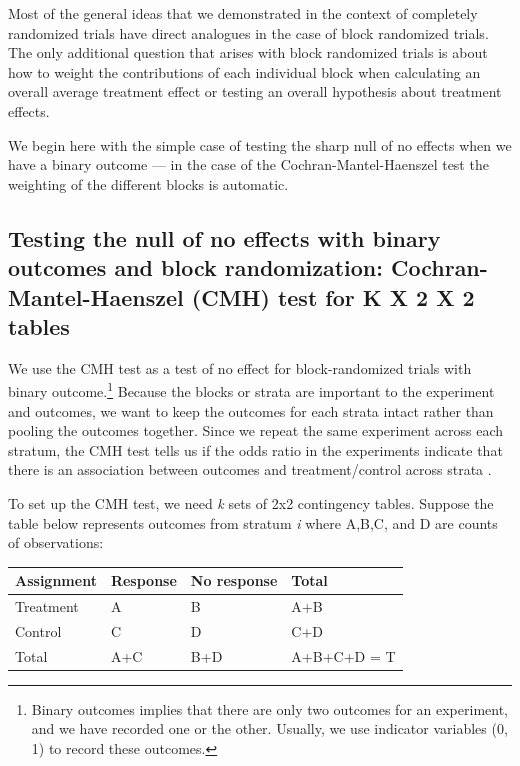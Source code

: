 \documentclass[
  12pt,
]{book}
\theoremstyle{definition}
\theoremstyle{definition}
\theoremstyle{definition}
\theoremstyle{remark}
\begin{document}
Most of the general ideas that we demonstrated in the context of
completely randomized trials have direct analogues in the case of block
randomized trials. The only additional question that arises with block
randomized trials is about how to weight the contributions of each
individual block when calculating an overall average treatment effect or
testing an overall hypothesis about treatment effects.

We begin here with the simple case of testing the sharp null of no
effects when we have a binary outcome --- in the case of the
Cochran-Mantel-Haenszel test the weighting of the different blocks is
automatic.

\hypertarget{testing-the-null-of-no-effects-with-binary-outcomes-and-block-randomization-cochran-mantel-haenszel-cmh-test-for-k-x-2-x-2-tables}{%
\subsection{Testing the null of no effects with binary outcomes and
block randomization: Cochran-Mantel-Haenszel (CMH) test for K X 2 X 2
tables}\label{testing-the-null-of-no-effects-with-binary-outcomes-and-block-randomization-cochran-mantel-haenszel-cmh-test-for-k-x-2-x-2-tables}}

We use the CMH test as a test of no effect for block-randomized trials
with binary outcome.\footnote{Binary outcomes implies that there are
  only two outcomes for an experiment, and we have recorded one or the
  other. Usually, we use indicator variables (0, 1) to record these
  outcomes.} Because the blocks or strata are important to the
experiment and outcomes, we want to keep the outcomes for each strata
intact rather than pooling the outcomes together. Since we repeat the
same experiment across each stratum, the CMH test tells us if the odds
ratio in the experiments indicate that there is an association between
outcomes and treatment/control across strata
\citep{cochran_methods_1954, mantel_statistical_1959}.

To set up the CMH test, we need \emph{k} sets of 2x2 contingency tables.
Suppose the table below represents outcomes from stratum \emph{i} where
A,B,C, and D are counts of observations:

\begin{longtable}[]{@{}llll@{}}
\toprule
Assignment & Response & No response & Total\tabularnewline
\midrule
\endhead
Treatment & A & B & A+B\tabularnewline
Control & C & D & C+D\tabularnewline
Total & A+C & B+D & A+B+C+D = T\tabularnewline
\bottomrule
\end{longtable}
\end{document}
